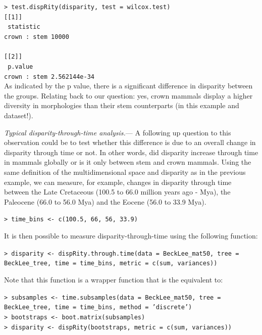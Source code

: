 \documentclass[12pt,letterpaper]{article}
\renewcommand{\subsubsection}[1]{%
\vspace{2ex}
\noindent
\textit{#1.}---}
\begin{document}
\noindent \texttt{> test.dispRity(disparity, test = wilcox.test)}\\

\noindent \texttt{[[1]]}\\
\noindent \texttt{             statistic}\\
\noindent \texttt{crown : stem     10000}\\
\noindent \texttt{ }\\
\noindent \texttt{[[2]]}\\
\noindent \texttt{                  p.value}\\
\noindent \texttt{crown : stem 2.562144e-34}\\

\bigskip
As indicated by the p value, there is a significant difference in disparity between the groups.
Relating back to our question: yes, crown mammals display a higher diversity in morphologies than their stem counterparts (in this example and dataset!).

\subsubsection{Typical disparity-through-time analysis}
A following up question to this observation could be to test whether this difference is due to an overall change in disparity through time or not.
In other words, did disparity increase through time in mammals globally or is it only between stem and crown mammals.
Using the same definition of the multidimensional space and disparity as in the previous example, we can measure, for example, changes in disparity through time between the Late Cretaceous (100.5 to 66.0 million years ago - Mya), the Paleocene (66.0 to 56.0 Mya) and the Eocene (56.0 to 33.9 Mya).

\noindent \texttt{> time\_bins <- c(100.5, 66, 56, 33.9)}

It is then possible to measure disparity-through-time using the following function:

\noindent \texttt{> disparity <- dispRity.through.time(data = BeckLee\_mat50, tree = BeckLee\_tree, time = time\_bins, metric = c(sum, variances))}

\noindent Note that this function is a wrapper function that is the equivalent to:

\noindent \texttt{> subsamples <- time.subsamples(data = BeckLee\_mat50, tree = BeckLee\_tree, time = time\_bins, method = 'discrete')}\\
\noindent \texttt{> bootstraps <- boot.matrix(subsamples)}\\
\noindent \texttt{> disparity <- dispRity(bootstraps, metric = c(sum, variances))}\\
\end{document}
